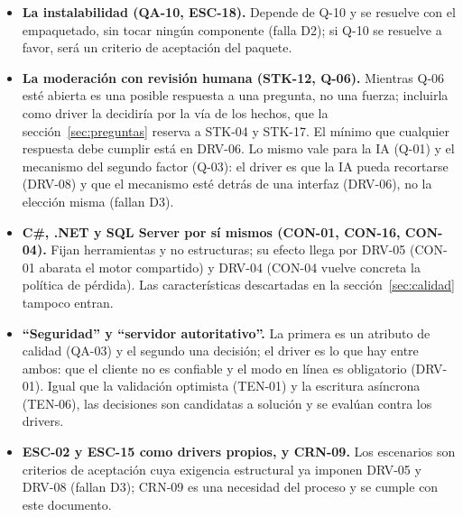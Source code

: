 \begin{itemize}
  \item \textbf{La instalabilidad (QA-10, ESC-18).} Depende de Q-10 y se resuelve con el empaquetado, sin tocar ningún componente (falla D2); si Q-10 se resuelve a favor, será un criterio de aceptación del paquete.
  \item \textbf{La moderación con revisión humana (STK-12, Q-06).} Mientras Q-06 esté abierta es una posible respuesta a una pregunta, no una fuerza; incluirla como driver la decidiría por la vía de los hechos, que la sección~\ref{sec:preguntas} reserva a STK-04 y STK-17. El mínimo que cualquier respuesta debe cumplir está en DRV-06. Lo mismo vale para la IA (Q-01) y el mecanismo del segundo factor (Q-03): el driver es que la IA pueda recortarse (DRV-08) y que el mecanismo esté detrás de una interfaz (DRV-06), no la elección misma (fallan D3).
  \item \textbf{C\#, .NET y SQL Server por sí mismos (CON-01, CON-16, CON-04).} Fijan herramientas y no estructuras; su efecto llega por DRV-05 (CON-01 abarata el motor compartido) y DRV-04 (CON-04 vuelve concreta la política de pérdida). Las características descartadas en la sección~\ref{sec:calidad} tampoco entran.
  \item \textbf{``Seguridad'' y ``servidor autoritativo''.} La primera es un atributo de calidad (QA-03) y el segundo una decisión; el driver es lo que hay entre ambos: que el cliente no es confiable y el modo en línea es obligatorio (DRV-01). Igual que la validación optimista (TEN-01) y la escritura asíncrona (TEN-06), las decisiones son candidatas a solución y se evalúan contra los drivers.
  \item \textbf{ESC-02 y ESC-15 como drivers propios, y CRN-09.} Los escenarios son criterios de aceptación cuya exigencia estructural ya imponen DRV-05 y DRV-08 (fallan D3); CRN-09 es una necesidad del proceso y se cumple con este documento.
\end{itemize}
